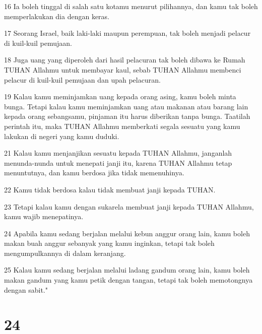 \par 16 Ia boleh tinggal di salah satu kotamu menurut pilihannya, dan kamu tak boleh memperlakukan dia dengan keras.
\par 17 Seorang Israel, baik laki-laki maupun perempuan, tak boleh menjadi pelacur di kuil-kuil pemujaan.
\par 18 Juga uang yang diperoleh dari hasil pelacuran tak boleh dibawa ke Rumah TUHAN Allahmu untuk membayar kaul, sebab TUHAN Allahmu membenci pelacur di kuil-kuil pemujaan dan upah pelacuran.
\par 19 Kalau kamu meminjamkan uang kepada orang asing, kamu boleh minta bunga. Tetapi kalau kamu meminjamkan uang atau makanan atau barang lain kepada orang sebangsamu, pinjaman itu harus diberikan tanpa bunga. Taatilah perintah itu, maka TUHAN Allahmu memberkati segala sesuatu yang kamu lakukan di negeri yang kamu duduki.
\par 21 Kalau kamu menjanjikan sesuatu kepada TUHAN Allahmu, janganlah menunda-nunda untuk menepati janji itu, karena TUHAN Allahmu tetap menuntutnya, dan kamu berdosa jika tidak memenuhinya.
\par 22 Kamu tidak berdosa kalau tidak membuat janji kepada TUHAN.
\par 23 Tetapi kalau kamu dengan sukarela membuat janji kepada TUHAN Allahmu, kamu wajib menepatinya.
\par 24 Apabila kamu sedang berjalan melalui kebun anggur orang lain, kamu boleh makan buah anggur sebanyak yang kamu inginkan, tetapi tak boleh mengumpulkannya di dalam keranjang.
\par 25 Kalau kamu sedang berjalan melalui ladang gandum orang lain, kamu boleh makan gandum yang kamu petik dengan tangan, tetapi tak boleh memotongnya dengan sabit."

\chapter{24}

